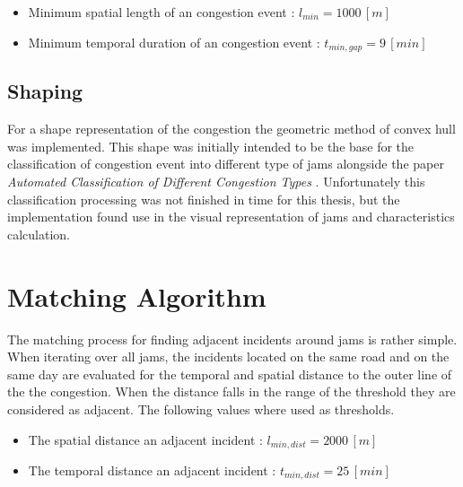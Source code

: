 \begin{itemize}
	\item Minimum spatial length of an congestion event : $l_{min} = 1000 \, [m]$
	\item Minimum temporal duration of an congestion event : $t_{min,gap} = 9 \, [min]$
\end{itemize}

\subsection{Shaping}
\label{methodology_detection_shaping}
For a shape representation of the congestion the geometric method of convex hull was implemented. This shape was initially intended to be the base for the classification of congestion event into different type of jams alongside the paper \textit{Automated Classification of Different Congestion Types} \parencite{Kessler2020}. Unfortunately this classification processing was not finished in time for this thesis, but the implementation found use in the visual representation of jams and characteristics calculation.


\section{Matching Algorithm}
\label{methodology_matching}
The matching process for finding adjacent incidents around jams is rather simple. When iterating over all jams, the incidents located on the same road and on the same day are evaluated for the temporal and spatial distance to the outer line of the the congestion. When the distance falls in the range of the threshold they are considered as adjacent. The following values where used as thresholds.

\begin{itemize}
	\item The spatial distance an adjacent incident : $l_{min,dist} = 2000 \, [m]$
	\item The temporal distance an adjacent incident : $t_{min,dist} = 25 \, [min]$
\end{itemize}

